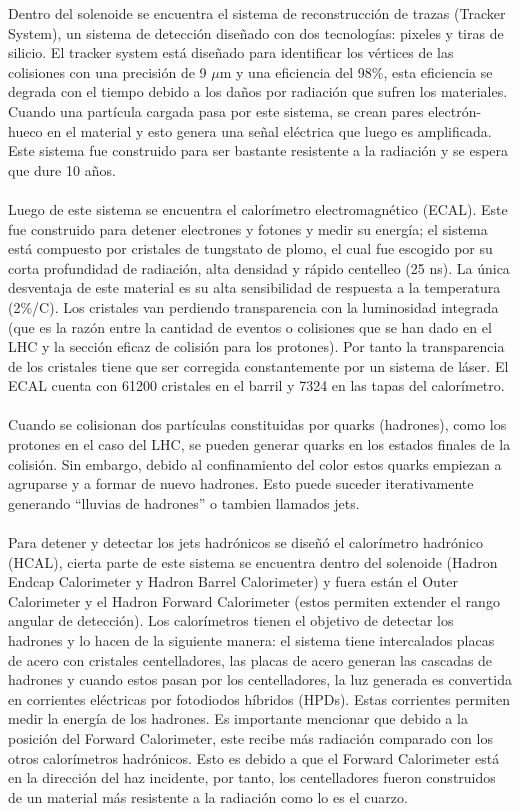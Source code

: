 Dentro del solenoide se encuentra el sistema de reconstrucción de trazas (Tracker System), un sistema de detección diseñado con dos tecnologías: pixeles y tiras de silicio. El tracker system está diseñado para identificar los vértices de las colisiones con una precisión de 9 $\mu$m y una eficiencia del 98\%, esta eficiencia se degrada con el tiempo debido a los daños por radiación que sufren los materiales. Cuando una partícula cargada pasa por este sistema, se crean pares electrón-hueco en el material y esto genera una señal eléctrica que luego es amplificada. Este sistema fue construido para ser bastante resistente a la radiación y se espera que dure 10 años.
\\
\\
Luego de este sistema se encuentra el calorímetro electromagnético (ECAL). Este fue construido para detener electrones y fotones y medir su energía; el sistema está compuesto por cristales de tungstato de plomo, el cual fue escogido por su corta profundidad de radiación, alta densidad y rápido centelleo (25 ns). La única desventaja de este material es su alta sensibilidad de respuesta a la temperatura (2\%/C). Los cristales van perdiendo transparencia con la luminosidad integrada (que es la razón entre la cantidad de eventos o colisiones que se han dado en el LHC y la sección eficaz de colisión para los protones\cite{RuizAlvarez:2016mhn}). Por tanto la transparencia de los cristales tiene que ser corregida constantemente por un sistema de láser. El ECAL cuenta con 61200 cristales en el barril y 7324 en las tapas del calorímetro.
\\
\\
Cuando se colisionan dos partículas constituidas por quarks (hadrones), como los protones en el caso del LHC, se pueden generar quarks en los estados finales de la colisión. Sin embargo, debido al confinamiento del color estos quarks empiezan a agruparse y a formar de nuevo hadrones. Esto puede suceder iterativamente generando ``lluvias de hadrones'' o tambien llamados jets.
\\
\\
Para detener y detectar los jets hadrónicos se diseñó el calorímetro hadrónico (HCAL), cierta parte de este sistema se encuentra dentro del solenoide (Hadron Endcap Calorimeter y Hadron Barrel Calorimeter) y fuera están el Outer Calorimeter y el Hadron Forward Calorimeter (estos permiten extender el rango angular de detección). Los calorímetros tienen el objetivo de detectar los hadrones y lo hacen de la siguiente manera: el sistema tiene intercalados placas de acero con cristales centelladores, las placas de acero generan las cascadas de hadrones y cuando estos pasan por los centelladores, la luz generada es convertida en corrientes eléctricas por fotodiodos híbridos (HPDs). Estas corrientes permiten medir la energía de los hadrones. Es importante mencionar que debido a la posición del Forward Calorimeter, este recibe más radiación comparado con los otros calorímetros hadrónicos. Esto es debido a que el Forward Calorimeter está en la dirección del haz incidente, por tanto, los centelladores fueron construidos de un material más resistente a la radiación como lo es el cuarzo.
